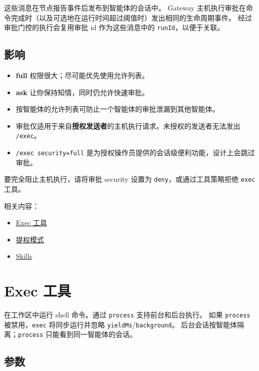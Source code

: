 这些消息在节点报告事件后发布到智能体的会话中。
Gateway 主机执行审批在命令完成时（以及可选地在运行时间超过阈值时）发出相同的生命周期事件。
经过审批门控的执行会复用审批 id 作为这些消息中的 \texttt{runId}，以便于关联。

\subsection{影响}


\begin{itemize}
  \item \textbf{full} 权限很大；尽可能优先使用允许列表。
  \item \textbf{ask} 让你保持知情，同时仍允许快速审批。
  \item 按智能体的允许列表可防止一个智能体的审批泄漏到其他智能体。
  \item 审批仅适用于来自\textbf{授权发送者}的主机执行请求。未授权的发送者无法发出 \texttt{/exec}。
  \item \texttt{/exec security=full} 是为授权操作员提供的会话级便利功能，设计上会跳过审批。
\end{itemize}

要完全阻止主机执行，请将审批 security 设置为 \texttt{deny}，或通过工具策略拒绝 \texttt{exec} 工具。

相关内容：

\begin{itemize}
  \item \href{/tools/exec}{Exec 工具}
  \item \href{/tools/elevated}{提权模式}
  \item \href{/tools/skills}{Skills}
\end{itemize}



\clearpage

\section{Exec 工具}


在工作区中运行 shell 命令。通过 \texttt{process} 支持前台和后台执行。
如果 \texttt{process} 被禁用，\texttt{exec} 将同步运行并忽略 \texttt{yieldMs}/\texttt{background}。
后台会话按智能体隔离；\texttt{process} 只能看到同一智能体的会话。

\subsection{参数}


